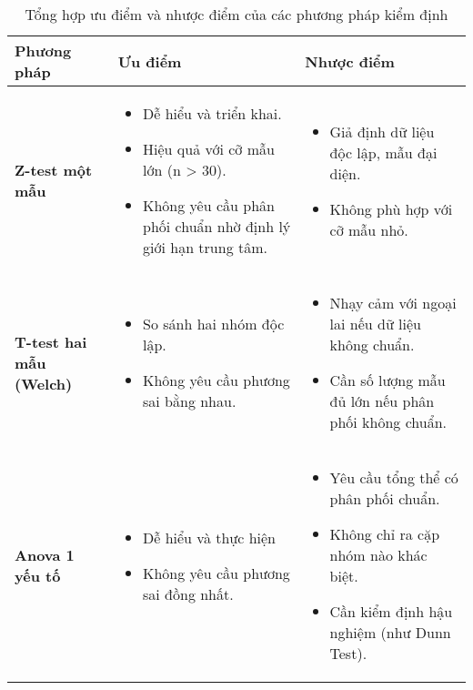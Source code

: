 \begin{table}[H]
\centering
\caption{Tổng hợp ưu điểm và nhược điểm của các phương pháp kiểm định}
\label{tab:summary_tests}
\renewcommand{\arraystretch}{1} %
\begin{tabular}{|p{3.2cm}|p{5.5cm}|p{5.5cm}|}
    
\hline
\textbf{Phương pháp} & \textbf{Ưu điểm} & \textbf{Nhược điểm} \\ \hline
\textbf{Z-test một mẫu} &
\begin{itemize}[leftmargin=*, topsep=0pt, partopsep=0pt, parsep=0pt, itemsep=0pt]
\item Dễ hiểu và triển khai.
    \item Hiệu quả với cỡ mẫu lớn (n > 30).
    \item Không yêu cầu phân phối chuẩn nhờ định lý giới hạn trung tâm.
\end{itemize} &
\begin{itemize}[leftmargin=*, topsep=0pt, partopsep=0pt, parsep=0pt, itemsep=0pt]
    \item Giả định dữ liệu độc lập, mẫu đại diện.
    \item Không phù hợp với cỡ mẫu nhỏ.
\end{itemize} \\ \hline
\textbf{T-test hai mẫu (Welch)} &
\begin{itemize}[leftmargin=*, topsep=0pt, partopsep=0pt, parsep=0pt, itemsep=0pt]
    \item So sánh hai nhóm độc lập.
    \item Không yêu cầu phương sai bằng nhau.
\end{itemize} &
\begin{itemize}[leftmargin=*, topsep=0pt, partopsep=0pt, parsep=0pt, itemsep=0pt]
    \item Nhạy cảm với ngoại lai nếu dữ liệu không chuẩn.
    \item Cần số lượng mẫu đủ lớn nếu phân phối không chuẩn.
\end{itemize} \\ \hline
\textbf{Anova 1 yếu tố}&
\begin{itemize}[leftmargin=*, topsep=0pt, partopsep=0pt, parsep=0pt, itemsep=0pt]
    \item  Dễ hiểu và thực hiện
    \item Không yêu cầu phương sai đồng nhất.
\end{itemize} &
\begin{itemize}[leftmargin=*, topsep=0pt, partopsep=0pt, parsep=0pt, itemsep=0pt]
    \item Yêu cầu tổng thể có phân phối chuẩn.
    \item Không chỉ ra cặp nhóm nào khác biệt.
    \item Cần kiểm định hậu nghiệm (như Dunn Test).
\end{itemize} \\ \hline


\end{tabular}
\end{table}
